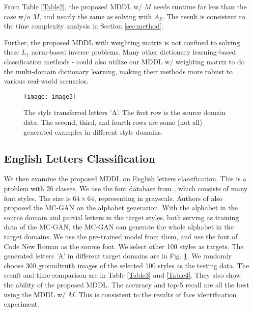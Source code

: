 \documentclass{article}
\begin{document}
From Table \ref{Table2}, the proposed MDDL w/ $M$ needs runtime far less than the case w/o $M$, and nearly the same as solving with $A_S$. The result is consistent to the time complexity analysis in Section \ref{sec:method}.

Further, the proposed MDDL with weighting matrix is not confined to solving these $L_1$ norm-based inverse problems. Many other dictionary learning-based classification methods \cite{zhang2011iccv}-\cite{tang2018structured} could also utilize our MDDL w/ weighting matrix to do the multi-domain dictionary learning, making their methods more robust to various real-world scenarios.

\begin{figure}[!tb]
	\vspace{-0.5cm}
    \centerline{\texttt{[image: image3]}}
    \caption{The style transferred letters 'A'. The first row is the source domain data. The second, third, and fourth rows are some (not all) generated examples in different style domains. }
    \label{A-GAN}
\end{figure}

\subsection{English Letters Classification}

We then examine the proposed MDDL on English letters classification. This is a problem with 26 classes. We use the font database from \cite{azadi2018multi}, which consists of many font styles. The size is $64\times 64$, representing in grayscale. Authors of \cite{azadi2018multi} also proposed the MC-GAN on the alphabet generation. With the alphabet in the source domain and partial letters in the target styles, both serving as training data of the MC-GAN, the MC-GAN can generate the whole alphabet in the target domains. We use the pre-trained model from them, and use the font of Code New Roman as the source font. We select other 100 styles as targets. The generated letters 'A' in different target domains are in Fig. \ref{A-GAN}. We randomly choose 300 groundtruth images of the selected 100 styles as the testing data. The result and time comparison are in Table \ref{Table3} and \ref{Table4}. They also show the ability of the proposed MDDL. The accuracy and top-5 recall are all the best using the MDDL w/ $M$. This is consistent to the results of face identification experiment.
\end{document}
